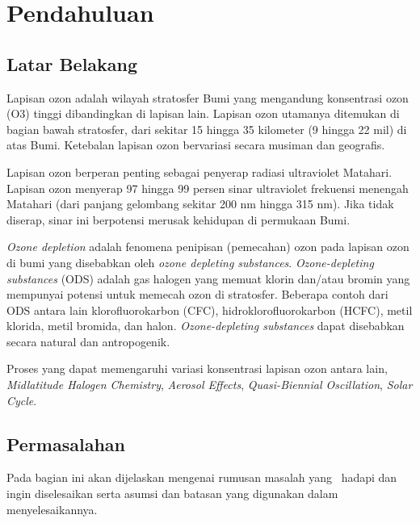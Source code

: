 \chapter{Pendahuluan}
\section{Latar Belakang}
Lapisan ozon adalah wilayah stratosfer Bumi yang mengandung konsentrasi ozon (O3) tinggi dibandingkan di lapisan lain. Lapisan ozon utamanya ditemukan di bagian bawah stratosfer, dari sekitar 15 hingga 35 kilometer (9 hingga 22 mil) di atas Bumi. Ketebalan lapisan ozon bervariasi secara musiman dan geografis.

Lapisan ozon berperan penting sebagai penyerap radiasi ultraviolet Matahari. Lapisan ozon menyerap 97 hingga 99 persen sinar ultraviolet frekuensi menengah Matahari (dari panjang gelombang sekitar 200 nm hingga 315 nm). Jika tidak diserap, sinar ini berpotensi merusak kehidupan di permukaan Bumi.

\textit{Ozone depletion} adalah fenomena penipisan (pemecahan) ozon pada lapisan ozon di bumi yang disebabkan oleh \textit{ozone depleting substances}. \textit{Ozone-depleting substances} (ODS) adalah gas halogen yang memuat klorin dan/atau bromin yang mempunyai potensi untuk memecah ozon di stratosfer. Beberapa contoh dari ODS antara lain klorofluorokarbon (CFC), hidroklorofluorokarbon (HCFC), metil klorida, metil bromida, dan halon. \textit{Ozone-depleting substances} dapat disebabkan secara natural dan antropogenik.

Proses yang dapat memengaruhi variasi konsentrasi lapisan ozon antara lain, \textit{Midlatitude Halogen Chemistry}, \textit{Aerosol Effects}, \textit{Quasi-Biennial Oscillation}, \textit{Solar Cycle}.



\section{Permasalahan}
Pada bagian ini akan dijelaskan mengenai rumusan masalah 
yang \saya~hadapi dan ingin diselesaikan serta asumsi dan batasan 
yang digunakan dalam menyelesaikannya.


